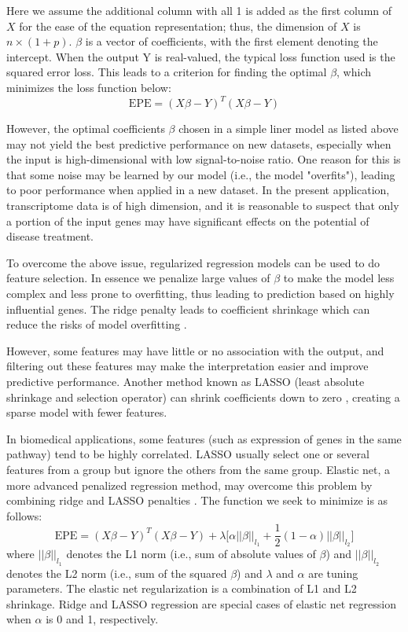       Here we assume the additional column with all 1 is added as the first column of $X$ for the ease of the equation representation; thus, the dimension of $X$ is $n \times (1 + p)$. $\beta$ is a vector of coefficients, with the first element denoting the intercept. When the output Y is real-valued, the typical loss function used is the squared error loss. This leads to a criterion for finding the optimal $\beta$, which minimizes the loss function below:
      \begin{equation}
        \mathrm{EPE} = (X \beta - Y)^T (X \beta - Y)
      \end{equation}

      However, the optimal coefficients $\beta$ chosen in a simple liner model as listed above may not yield the best predictive performance on new datasets, especially when the input is high-dimensional with low signal-to-noise ratio. One reason for this is that some noise may be learned by our model (i.e., the model "overfits"), leading to poor performance when applied in a new dataset. In the present application, transcriptome data is of high dimension, and it is reasonable to suspect that only a portion of the input genes may have significant effects on the potential of disease treatment.

      To overcome the above issue, regularized regression models can be used to do feature selection. In essence we penalize large values of $\beta$ to make the model less complex and less prone to overfitting, thus leading to prediction based on highly influential genes. The ridge penalty leads to coefficient shrinkage which can reduce the risks of model overfitting \cite{hoerl1970ridge}.

      However, some features may have little or no association with the output, and filtering out these features may make the interpretation easier and improve predictive performance. Another method known as LASSO (least absolute shrinkage and selection operator) can shrink coefficients down to zero \cite{tibshirani1996regression}, creating a sparse model with fewer features.

      In biomedical applications, some features (such as expression of genes in the same pathway) tend to be highly correlated. LASSO usually select one or several features from a group but ignore the others from the same group. Elastic net, a more advanced penalized regression method, may overcome this problem by combining ridge and LASSO penalties \cite{zou2005regularization}. The function we seek to minimize is as follows:
      \begin{equation}
        \mathrm{EPE} = (X \beta - Y)^T (X \beta - Y) + \lambda \bigg[ \alpha ||\beta||_{l_1} + \frac{1}{2} (1 - \alpha) ||\beta||_{l_2}\bigg]
      \end{equation}
      where $||\beta||_{l_1}$ denotes the L1 norm (i.e., sum of absolute values of $\beta$) and $||\beta||_{l_2}$ denotes the L2 norm (i.e., sum of the squared $\beta$) and $\lambda$ and $\alpha$ are tuning parameters. The elastic net regularization is a combination of L1 and L2 shrinkage. Ridge and LASSO regression are special cases of elastic net regression when $\alpha$ is 0 and 1, respectively.

